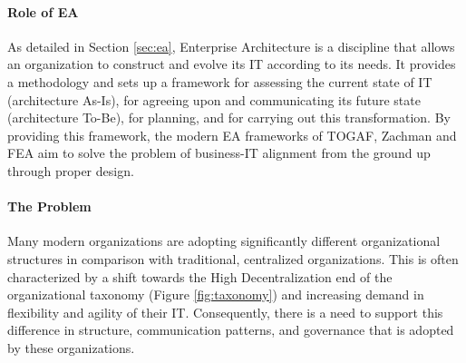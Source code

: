 
\paragraph*{Role of EA}

As detailed in Section \ref{sec:ea}, Enterprise Architecture is a discipline that allows an organization to construct and evolve its IT according to its needs. It provides a methodology and sets up a framework for assessing the current state of IT (architecture As-Is), for agreeing upon and communicating its future state (architecture To-Be), for planning, and for carrying out this transformation. By providing this framework, the modern EA frameworks of TOGAF, Zachman and FEA aim to solve the problem of business-IT alignment from the ground up through proper design. 

\paragraph*{The Problem} 

Many modern organizations are adopting significantly different organizational structures in comparison with traditional, centralized organizations. This is often characterized by a shift towards the High Decentralization end of the organizational taxonomy (Figure \ref{fig:taxonomy}) and increasing demand in flexibility and agility of their IT. Consequently, there is a need to support this difference in structure, communication patterns, and governance that is adopted by these organizations.

%


